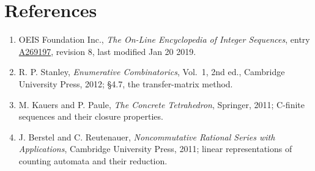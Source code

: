 \documentclass[11pt]{article}
\theoremstyle{definition}
\begin{document}
\section{References}

\begin{enumerate}

\item OEIS Foundation Inc., \emph{The On-Line Encyclopedia of Integer Sequences}, entry \href{https://oeis.org/A269197}{A269197}, revision 8, last modified Jan 20 2019.

\item R. P. Stanley, \emph{Enumerative Combinatorics}, Vol.~1, 2nd ed., Cambridge University Press, 2012; \S4.7, the transfer-matrix method.

\item M. Kauers and P. Paule, \emph{The Concrete Tetrahedron}, Springer, 2011; C-finite sequences and their closure properties.

\item J. Berstel and C. Reutenauer, \emph{Noncommutative Rational Series with Applications}, Cambridge University Press, 2011; linear representations of counting automata and their reduction.

\end{enumerate}
\end{document}
